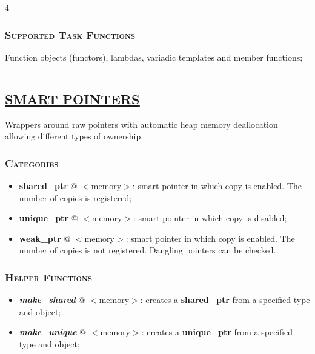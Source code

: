 \documentclass[10pt]{article}
\begin{document}
\begin{multicols*}{4}
{\subsubsection*{\textsc{Supported Task Functions}} 
\noindent
Function objects (functors), lambdas, variadic templates and member functions; 

}

\par\noindent\rule{197pt}{0.4pt}


{\color{Blue}
\subsection*{\href{https://en.cppreference.com/w/cpp/memory}{\underline{SMART POINTERS}}}	
\noindent
Wrappers around raw pointers with automatic heap memory deallocation allowing different types of ownership.

\subsubsection*{\textsc{Categories}} 
\begin{itemize}[leftmargin=*,topsep=0.25pt]
  \setlength\itemsep{-1.8pt}
	\item  {\textbf{shared\_ptr}} @ $<$memory$>$: smart pointer in which copy is enabled. The number of copies is registered;
	\item  {\textbf{unique\_ptr}} @ $<$memory$>$: smart pointer in which copy is disabled;
	\item  {\textbf{weak\_ptr}} @ $<$memory$>$: smart pointer in which copy is enabled. The number of copies is not registered. Dangling pointers can be checked.
\end{itemize}

\subsubsection*{\textsc{Helper Functions}} 
\begin{itemize}[leftmargin=*,topsep=0.25pt]
  \setlength\itemsep{-1.8pt}
	\item  \emph{\textbf{make\_shared}} @ $<$memory$>$: creates a \textbf{shared\_ptr} from a specified type and object;
	\item  \emph{\textbf{make\_unique}} @ $<$memory$>$: creates a \textbf{unique\_ptr} from a specified type and object;
\end{itemize}

}
\end{multicols*}
\end{document}
